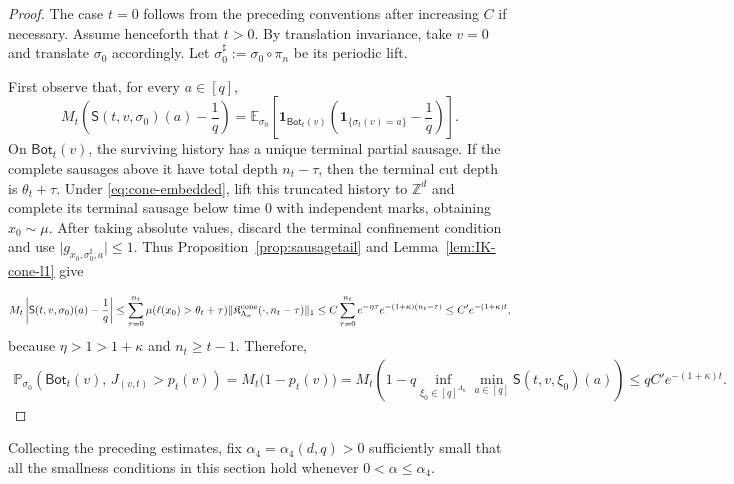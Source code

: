 \documentclass[letterpaper,11pt,reqno]{amsart}
\theoremstyle{definition}
\newcommand{\IK}{\mathfrak{K}}
\begin{document}
\begin{proof}

The case \(t=0\) follows from the preceding conventions after increasing \(C\) if necessary.
Assume henceforth that \(t>0\).
By translation invariance, take \(v=0\) and translate \(\sigma_0\) accordingly.
Let \(\sigma_0^\sharp:=\sigma_0\circ\pi_n\) be its periodic lift.

First observe that, for every \(a\in[q]\),
\[
M_t\left(\mathsf S(t,v,\sigma_0)(a)-\frac{1}{q}\right)
=
\mathbb E_{\sigma_0}\left[
\mathbf 1_{\mathsf{Bot}_t(v)}
\left(\mathbf 1_{\{\sigma_t(v)=a\}}-\frac1q\right)
\right].
\]
On \(\mathsf{Bot}_t(v)\), the surviving history has a unique terminal partial
sausage. If the complete sausages above it have total depth
\(n_t-\tau\), then the terminal cut depth is \(\theta_t+\tau\).
Under \eqref{eq:cone-embedded}, lift this truncated history to
\(\mathbb Z^d\) and complete its terminal sausage below time \(0\) with
independent marks, obtaining \(x_0\sim\mu\). After taking absolute values,
discard the terminal confinement condition and use
\(\lvert g_{x_0,\sigma_0^\sharp,a}\rvert\le1\). Thus
Proposition~\ref{prop:sausagetail} and Lemma~\ref{lem:IK-cone-l1} give


\[
M_t\left|
    {\mathsf S}(t,v,\sigma_0)(a)
    -\frac{1}{q}
    \right|
    \le
    \sum_{\tau=0}^{n_t}
    \mu(\ell(x_0)>\theta_t+\tau)
    \|\IK_{\Lambda_n}^{\rm cone}(\cdot,n_t-\tau)\|_1
    \leq
    C\sum_{\tau=0}^{n_t}
    e^{-\eta\tau}
    e^{-(1+\kappa)(n_t-\tau)}
    \leq C' e^{-(1+\kappa)t},
\]
because \(\eta>1>1+\kappa\) and \(n_t\ge t-1\). Therefore,
\[
\begin{aligned}
\mathbb{P}_{\sigma_0}\left(
\mathsf{Bot}_t(v),\,J_{(v,t)}>p_t(v)
\right)
=M_t\bigl(1-p_t(v)\bigr)
=M_t\left(
1-q\inf_{\xi_0\in[q]^{\Lambda_n}}
\min_{a\in[q]}\mathsf S(t,v,\xi_0)(a)
\right)
\leq qC' e^{-(1+\kappa)t}.
\end{aligned}
\]




\end{proof}

Collecting the preceding estimates, fix
\(\alpha_4=\alpha_4(d,q)>0\) sufficiently small that all the
smallness conditions in this section hold whenever
\(0<\alpha\le\alpha_4\).

\end{document}
